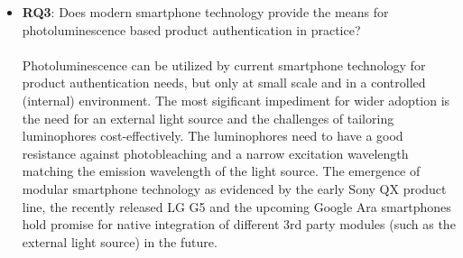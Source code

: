 \documentclass[thesis.tex]{subfiles}
\begin{document}
\begin{itemize}[label=, leftmargin=*]
  \item \textbf{RQ3}: Does modern smartphone technology provide the means for photoluminescence based product authentication in practice?\\\\
  Photoluminescence can be utilized by current smartphone technology for product authentication needs, but only at small scale and in a controlled (internal) environment. The most sigificant impediment for wider adoption is the need for an external light source and the challenges of tailoring luminophores cost-effectively. The luminophores need to have a good resistance against photobleaching and a narrow excitation wavelength matching the emission wavelength of the light source. The emergence of modular smartphone technology as evidenced by the early Sony QX product line, the recently released LG G5 and the upcoming Google Ara smartphones hold promise for native integration of different 3rd party modules (such as the external light source) in the future.
\end{itemize}
\end{document}
